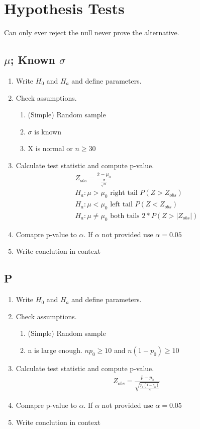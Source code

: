 \section{Hypothesis Tests}
Can only ever reject the null never prove the alternative.

\subsection{$\mu$; Known $\sigma$}
\begin{enumerate}
\item Write $H_0$ and $H_a$ and define parameters.
\item Check assumptions.
  \begin{enumerate}
  \item (Simple) Random sample
  \item $\sigma$ is known
  \item X is normal or $n \geq 30$
  \end{enumerate}
\item Calculate test statistic and compute p-value.
  \begin{align}
    Z_{obs} = \frac{\overbar{x} - \mu_0}{\frac{\sigma}{\sqrt{n}}} \\
    H_a : \mu > \mu_0 \text{ right tail } P(Z > Z_{obs}) \\
    H_a : \mu < \mu_0 \text{ left tail } P(Z < Z_{obs}) \\
    H_a : \mu \ne \mu_0 \text{ both tails } 2*P(Z > \lvert Z_{obs}\rvert)
  \end{align}
\item Comapre p-value to $\alpha$. If $\alpha$ not provided use $\alpha = 0.05$
\item Write conclution in context
\end{enumerate}

\subsection{P}
\begin{enumerate}
\item Write $H_0$ and $H_a$ and define parameters.
\item Check assumptions.
  \begin{enumerate}
  \item (Simple) Random sample
  \item n is large enough. $np_0 \geq 10$ and $ n(1 - p_0) \geq 10$
  \end{enumerate}
\item Calculate test statistic and compute p-value.
  \begin{align}
    Z_{obs} = \frac{\hat{p} - p_0}{\sqrt{\frac{p_0(1-p_0)}{n}}}
  \end{align}
\item Comapre p-value to $\alpha$. If $\alpha$ not provided use $\alpha = 0.05$
\item Write conclution in context
\end{enumerate}

